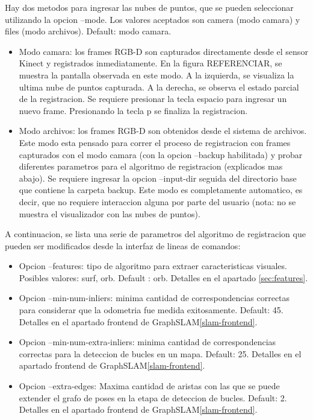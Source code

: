 Hay dos metodos para ingresar las nubes de puntos, que se pueden seleccionar utilizando la opcion --mode.
Los valores aceptados son camera (modo camara) y files (modo archivos). Default: modo camara.
\begin{itemize}

\item Modo camara: los frames RGB-D son capturados directamente desde el sensor Kinect y registrados inmediatamente. En la figura REFERENCIAR, se muestra la pantalla observada en este modo. A la izquierda, se visualiza la ultima nube de puntos capturada. A la derecha, se observa el estado parcial de la registracion. Se requiere presionar la tecla espacio para ingresar un nuevo frame. Presionando la tecla p se finaliza la registracion.

\item Modo archivos: los frames RGB-D son obtenidos desde el sistema de archivos. Este modo esta pensado para correr el proceso de registracion con frames capturados con el modo camara (con la opcion --backup habilitada) y probar diferentes parametros para el algoritmo de registracion (explicados mas abajo). Se requiere ingresar la opcion --input-dir seguida del directorio base que contiene la carpeta backup. Este modo es completamente automatico, es decir, que no requiere interaccion alguna por parte del usuario (nota: no se muestra el visualizador con las nubes de puntos).

\end{itemize}

A continuacion, se lista una serie de parametros del algoritmo de registracion que pueden ser modificados desde la interfaz de lineas de comandos:

\begin{itemize}

\item Opcion --features: tipo de algoritmo para extraer caracteristicas visuales. Posibles valores: surf, orb. Default : orb. Detalles en el apartado \ref{sec:features}.

\item Opcion --min-num-inliers: minima cantidad de correspondencias correctas para considerar que la odometria fue medida exitosamente. Default: 45. Detalles en el apartado frontend de GraphSLAM\ref{slam-frontend}.	

\item Opcion --min-num-extra-inliers: minima cantidad de correspondencias correctas para la deteccion de bucles en un mapa. Default: 25. Detalles en el apartado frontend de GraphSLAM\ref{slam-frontend}.

\item Opcion --extra-edges: Maxima cantidad de aristas con las que se puede extender el grafo de poses en la etapa de deteccion de bucles. Default: 2. Detalles en el apartado frontend de GraphSLAM\ref{slam-frontend}.

\end{itemize}


